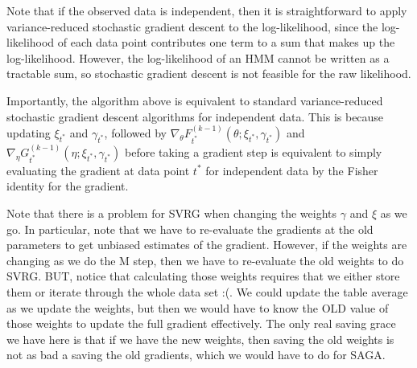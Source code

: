 Note that if the observed data is independent, then it is straightforward to apply variance-reduced stochastic gradient descent to the log-likelihood, since the log-likelihood of each data point contributes one term to a sum that makes up the log-likelihood. However, the log-likelihood of an HMM cannot be written as a tractable sum, so stochastic gradient descent is not feasible for the raw likelihood. 

Importantly, the algorithm above is equivalent to standard variance-reduced stochastic gradient descent algorithms for independent data. This is because updating $\xi_{t^*}$ and $\gamma_{t^*}$, followed by $\nabla_{\theta} F^{(k-1)}_{t^*}(\theta;\xi_{t^*},\gamma_{t^*})$ and $\nabla_{\eta} G^{(k-1)}_{t^*}(\eta;\xi_{t^*},\gamma_{t^*})$ before taking a gradient step is equivalent to simply evaluating the gradient at data point $t^*$ for independent data by the Fisher identity for the gradient.

Note that there is a problem for SVRG when changing the weights $\gamma$ and $\xi$ as we go. In particular, note that we have to re-evaluate the gradients at the old parameters to get unbiased estimates of the gradient. However, if the weights are changing as we do the M step, then we have to re-evaluate the old weights to do SVRG. BUT, notice that calculating those weights requires that we either store them or iterate through the whole data set :(. We could update the table average as we update the weights, but then we would have to know the OLD value of those weights to update the full gradient effectively. The only real saving grace we have here is that if we have the new weights, then saving the old weights is not as bad a saving the old gradients, which we would have to do for SAGA.
